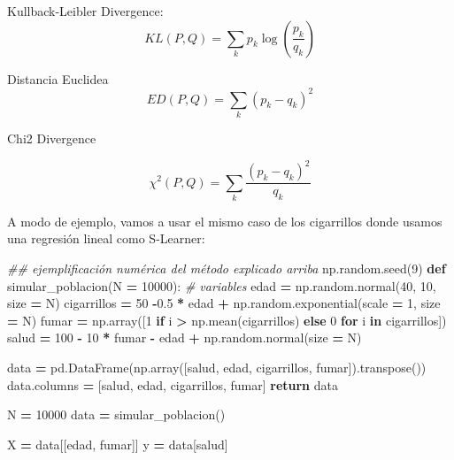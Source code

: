\documentclass[
  a4paper,
  DIV=11,
  numbers=noendperiod]{scrreprt}
\newenvironment{Shaded}{\begin{snugshade}}{\end{snugshade}}
\newcommand{\CommentTok}[1]{\textcolor[rgb]{0.56,0.35,0.01}{\textit{#1}}}
\newcommand{\ControlFlowTok}[1]{\textcolor[rgb]{0.13,0.29,0.53}{\textbf{#1}}}
\newcommand{\DecValTok}[1]{\textcolor[rgb]{0.00,0.00,0.81}{#1}}
\newcommand{\FloatTok}[1]{\textcolor[rgb]{0.00,0.00,0.81}{#1}}
\newcommand{\KeywordTok}[1]{\textcolor[rgb]{0.13,0.29,0.53}{\textbf{#1}}}
\newcommand{\NormalTok}[1]{#1}
\newcommand{\OperatorTok}[1]{\textcolor[rgb]{0.81,0.36,0.00}{\textbf{#1}}}
\newcommand{\StringTok}[1]{\textcolor[rgb]{0.31,0.60,0.02}{#1}}
\begin{document}
Kullback-Leibler Divergence:
\[KL(P, Q) = \sum_{k} p_k \log \left( \frac{p_k}{q_k} \right)
\]

Distancia Euclidea \[ED(P, Q) = \sum_{k} (p_k - q_k)^2
\]

Chi2 Divergence

\[\chi^2(P, Q) = \sum_{k} \frac{(p_k - q_k)^2}{q_k}
\]

A modo de ejemplo, vamos a usar el mismo caso de los cigarrillos donde
usamos una regresión lineal como S-Learner:

\begin{Shaded}
\begin{Highlighting}[numbers=left,,]
\CommentTok{\#\# ejemplificación numérica del método explicado arriba}
\NormalTok{np.random.seed(}\DecValTok{9}\NormalTok{)}
\KeywordTok{def}\NormalTok{ simular\_poblacion(N }\OperatorTok{=} \DecValTok{10000}\NormalTok{):}
    \CommentTok{\# variables}
\NormalTok{    edad }\OperatorTok{=}\NormalTok{ np.random.normal(}\DecValTok{40}\NormalTok{, }\DecValTok{10}\NormalTok{, size }\OperatorTok{=}\NormalTok{ N)}
\NormalTok{    cigarrillos }\OperatorTok{=} \DecValTok{50} \OperatorTok{{-}}\FloatTok{0.5} \OperatorTok{*}\NormalTok{ edad }\OperatorTok{+}\NormalTok{ np.random.exponential(scale }\OperatorTok{=} \DecValTok{1}\NormalTok{, size }\OperatorTok{=}\NormalTok{ N)}
\NormalTok{    fumar }\OperatorTok{=}\NormalTok{ np.array([}\DecValTok{1} \ControlFlowTok{if}\NormalTok{ i }\OperatorTok{\textgreater{}}\NormalTok{ np.mean(cigarrillos) }\ControlFlowTok{else} \DecValTok{0} \ControlFlowTok{for}\NormalTok{ i }\KeywordTok{in}\NormalTok{ cigarrillos])}
\NormalTok{    salud }\OperatorTok{=} \DecValTok{100} \OperatorTok{{-}} \DecValTok{10} \OperatorTok{*}\NormalTok{ fumar  }\OperatorTok{{-}}\NormalTok{ edad }\OperatorTok{+}\NormalTok{ np.random.normal(size }\OperatorTok{=}\NormalTok{ N)}

\NormalTok{    data }\OperatorTok{=}\NormalTok{ pd.DataFrame(np.array([salud, edad, cigarrillos, fumar]).transpose())}
\NormalTok{    data.columns }\OperatorTok{=}\NormalTok{ [}\StringTok{\textquotesingle{}salud\textquotesingle{}}\NormalTok{, }\StringTok{\textquotesingle{}edad\textquotesingle{}}\NormalTok{, }\StringTok{\textquotesingle{}cigarrillos\textquotesingle{}}\NormalTok{, }\StringTok{\textquotesingle{}fumar\textquotesingle{}}\NormalTok{]}
    \ControlFlowTok{return}\NormalTok{ data}

\NormalTok{N }\OperatorTok{=} \DecValTok{10000}
\NormalTok{data }\OperatorTok{=}\NormalTok{ simular\_poblacion()}

\NormalTok{X }\OperatorTok{=}\NormalTok{ data[[}\StringTok{\textquotesingle{}edad\textquotesingle{}}\NormalTok{, }\StringTok{\textquotesingle{}fumar\textquotesingle{}}\NormalTok{]]}
\NormalTok{y }\OperatorTok{=}\NormalTok{ data[}\StringTok{\textquotesingle{}salud\textquotesingle{}}\NormalTok{]}


\end{Highlighting}
\end{Shaded}
\end{document}
